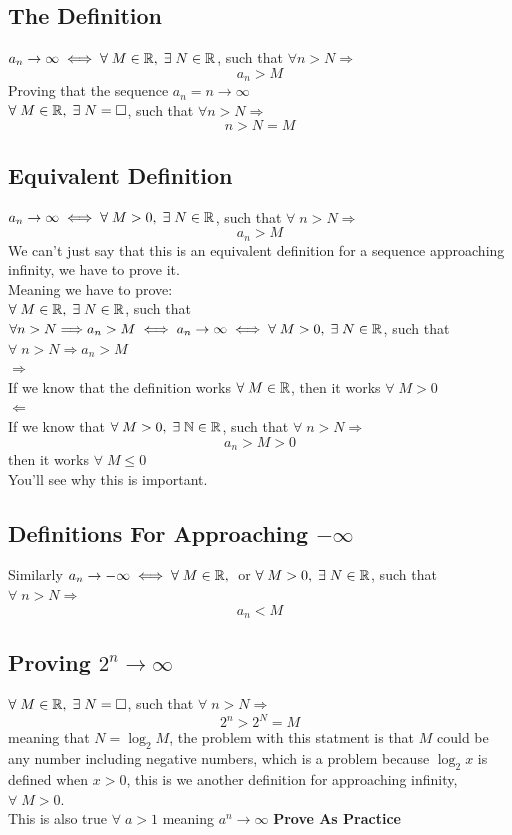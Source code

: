 \subsection{The Definition}
$a_n\rightarrow \infty \iff \forall\; M\in \mathbb{R},\; \exists\;N\in \mathbb{R}$, such that $\forall n>N \Longrightarrow$\\
\[
    a_n>M
\]
Proving that the sequence $a_n=n \rightarrow \infty$\\
$\forall\; M\in \mathbb{R},\; \exists\; N=\square$, such that $\forall n>N\Longrightarrow$
\[
    n>N=M
\]
\subsection{Equivalent Definition}
$a_n\rightarrow \infty \iff \forall\;M>0,\;\exists\; N\in \mathbb{R}$, such that $\forall\; n>N\Longrightarrow$
\[
    a_n>M
\]
We can't just say that this is an equivalent definition for a sequence approaching infinity, we have to prove it.\\
Meaning we have to prove:\\
$\forall\; M\in \mathbb{R},\; \exists\;N\in \mathbb{R}$, such that $\forall n>N \Longrightarrow a_n>M \iff a_n\rightarrow \infty \iff \forall\;M>0,\;\exists\; N\in \mathbb{R}$, such that $\forall\; n>N\Longrightarrow a_n>M$\\
$\Longrightarrow$\\
If we know that the definition works $\forall\; M\in \mathbb{R}$, then it works $\forall\;M>0$\\
$\Longleftarrow$\\
If we know that $\forall\; M>0,\;\exists\; \mathbb{N}\in\mathbb{R}$, such that $\forall\; n>N \Longrightarrow$
\[
    a_n>M>0
\]
then it works $\forall\; M\leq 0$\\
You'll see why this is important.\\
\subsection{Definitions For Approaching $-\infty$}
Similarly $a_n\rightarrow -\infty \iff \forall\; M\in \mathbb{R},\;$ or $\forall\; M>0,\; \exists\; N\in \mathbb{R}$, such that $\forall\; n>N\Longrightarrow$
\[
    a_n<M
\] 
\subsection{Proving $2^n\rightarrow \infty$}
$\forall\; M\in \mathbb{R},\; \exists\; N=\square$, such that $\forall\; n>N\Longrightarrow$
\[
    2^n>2^N = M
\]
meaning that $N = \log_2 {M}$, the problem with this statment is that $M$ could be any number including negative numbers, which is a problem because $\log_2{x}$ is defined when $x>0$, this is we another definition for approaching infinity,  $\forall\;M>0.$\\
This is also true $\forall\; a>1$ meaning $a^n \rightarrow \infty$ \textbf{Prove As Practice}
